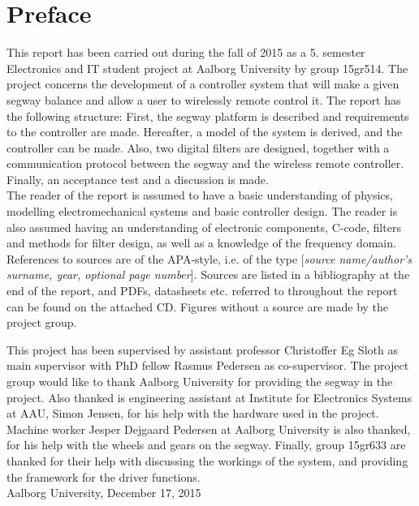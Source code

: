 \chapter*{Preface}\label{ch:forord}%
This report has been carried out during the fall of 2015 as a 5. semester Electronics and IT student project at Aalborg University by group 15gr514. The project concerns the development of a controller system that will make a given segway balance and allow a user to wirelessly remote control it.%
The report has the following structure: First, the segway platform is described and requirements to the controller are made. Hereafter, a model of the system is derived, and the controller can be made. Also, two digital filters are designed, together with a communication protocol between the segway and the wireless remote controller. Finally, an acceptance test and a discussion is made.\\
The reader of the report is assumed to have a basic understanding of physics, modelling electromechanical systems and basic controller design.
The reader is also assumed having an understanding of electronic components, C-code, filters and methods for filter design, as well as a knowledge of the frequency domain.
References to sources are of the APA-style, i.e. of the type [\emph{source name/author's surname, year, optional page number}]. Sources are listed in a bibliography at the end of the report, and PDFs, datasheets etc. referred to throughout the report can be found on the attached CD. Figures without a source are made by the project group.%

This project has been supervised by assistant professor Christoffer Eg Sloth as main supervisor with PhD fellow Rasmus Pedersen as co-supervisor. 
The project group would like to thank Aalborg University for providing the segway in the project. 
Also thanked is engineering assistant at Institute for Electronics Systems at AAU, Simon Jensen, for his help with the hardware used in the project. Machine worker Jesper Dejgaard Pedersen at Aalborg University is also thanked, for his help with the wheels and gears on the segway. Finally, group 15gr633 are thanked for their help with discussing the workings of the system, and providing the framework for the \iic driver functions.\\
\vspace{0.5\baselineskip}\hfill Aalborg University, December 17, 2015

